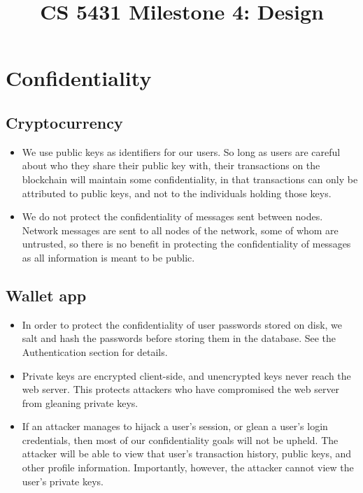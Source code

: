 \documentclass[a4paper,12pt]{article}
\title{CS 5431 Milestone 4: Design}
\author{
\iam{James Cassell}{jcc384}
\and
\iam{Evan King}{esk79}
\and
\iam{Ethan Koenig}{etk39}
\and
\iam{Eric Perdew}{ecp84}
\and
\iam{Will Ronchetti}{wrr33}
}
\begin{document}
\maketitle

\section{Confidentiality}

\subsection{Cryptocurrency}

\begin{itemize}
\item  We use public keys as identifiers for our users. So long as users are careful about who they share their public key with, their transactions on the blockchain will maintain some confidentiality, in that transactions can only be attributed to public keys, and not to the individuals holding those keys.
\item We do not protect the confidentiality of messages sent between nodes.
Network messages are sent to all nodes of the network, some of whom are untrusted, so there is no benefit in protecting the confidentiality of messages as all information is meant to be public.
\end{itemize}

\subsection{Wallet app}

\begin{itemize}
\item In order to protect the confidentiality of user passwords stored on disk, we salt and hash the passwords before storing them in the database. See the Authentication section for details.
\item Private keys are encrypted client-side, and unencrypted keys never reach the web server. This protects attackers who have compromised the web server from gleaning private keys.
\item If an attacker manages to hijack a user's session, or glean a user's login credentials, then most of our confidentiality goals will not be upheld. The attacker will be able to view that user's transaction history, public keys, and other profile information. Importantly, however, the attacker cannot view the user's private keys.
\end{itemize}
\end{document}
